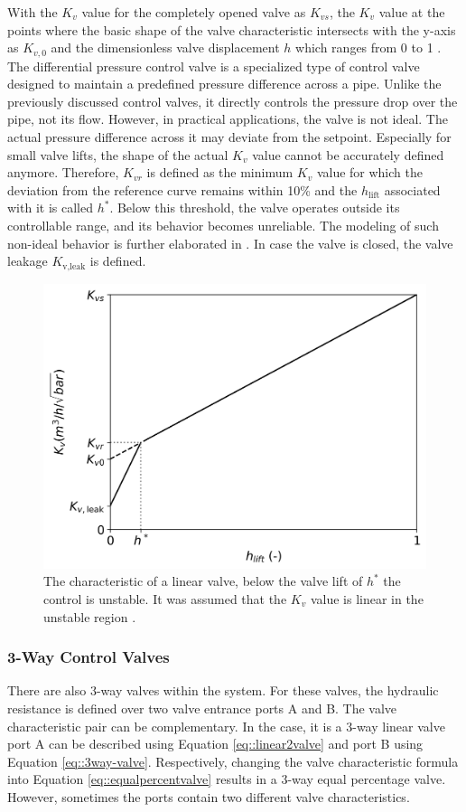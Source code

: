 With the $K_v$ value for the completely opened valve as $K_{vs}$, the $K_v$ value at the points where the basic shape of the valve characteristic intersects with the y-axis as $K_{v,0}$ and the dimensionless valve displacement $h$ which ranges from 0 to 1 \cite{Artikelphdchris}. The differential pressure control valve is a specialized type of control valve designed to maintain a predefined pressure difference across a pipe. Unlike the previously discussed control valves, it directly controls the pressure drop over the pipe, not its flow. However, in practical applications, the valve is not ideal. The actual pressure difference across it may deviate from the setpoint. Especially for small valve lifts, the shape of the actual $K_v$ value cannot be accurately defined anymore. Therefore, $K_{vr}$ is defined as the minimum $K_v$ value for which the deviation from the reference curve remains within 10\% and the $h_{\text{lift}}$ associated with it is called $h^{*}$. Below this threshold, the valve operates outside its controllable range, and its behavior becomes unreliable. The modeling of such non-ideal behavior is further elaborated in \cite{echtephdthesis}. In case the valve is closed, the valve leakage $K_{\text{v,leak}}$ is defined.  

\begin{figure}[h!]
    \centering
    \includegraphics[width=0.65\linewidth]{Literature Survey - DCSC template/figuresLIT/Kvs_plot.png}
    \caption{The characteristic of a linear valve, below the valve lift of $h^*$ the control is unstable. It was assumed that the $K_v$ value is linear in the unstable region \cite{echtephdthesis}.}
    \label{fig:enter-label}
\end{figure}

\subsubsection{3-Way Control Valves}
There are also 3-way valves within the system. For these valves, the hydraulic resistance is defined over two valve entrance ports A and B.
The valve characteristic pair can be complementary. In the case, it is a 3-way linear valve port A can be described using Equation \ref{eq::linear2valve} and port B using Equation \ref{eq::3way-valve}. Respectively, changing the valve characteristic formula into Equation \ref{eq::equalpercentvalve} results in a 3-way equal percentage valve. However, sometimes the ports contain two different valve characteristics. 

